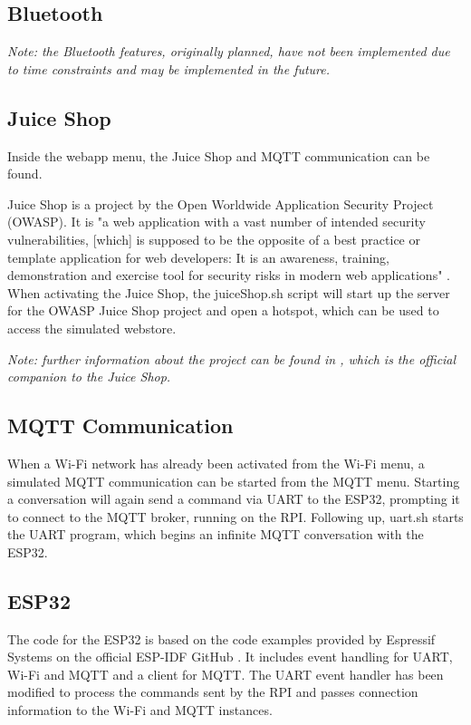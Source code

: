 

\subsection{Bluetooth}
\textit{Note: the Bluetooth features, originally planned, have not been implemented due to time constraints and may be implemented in the future.}

\subsection{Juice Shop}\label{ssec:juice_shop}
Inside the webapp menu, the Juice Shop and MQTT communication can be found.

Juice Shop is a project by the Open Worldwide Application Security Project (OWASP).
It is "a web application with a vast number of intended security vulnerabilities, [which] is supposed to be the opposite of a best practice or template application for web developers: It is an awareness, training, demonstration and exercise tool for security risks in modern web applications" \cite{PWNING_JuiceShop}.
When activating the Juice Shop, the juiceShop.sh script will start up the server for the OWASP Juice Shop project and open a hotspot, which can be used to access the simulated webstore.

\textit{Note: further information about the project can be found in \cite{PWNING_JuiceShop}, which is the official companion to the Juice Shop.}

\subsection{MQTT Communication}
When a Wi-Fi network has already been activated from the Wi-Fi menu, a simulated MQTT communication can be started from the MQTT menu.
Starting a conversation will again send a command via UART to the ESP32, prompting it to connect to the MQTT broker, running on the RPI.
Following up, uart.sh starts the UART program, which begins an infinite MQTT conversation with the ESP32.

\subsection{ESP32}
The code for the ESP32 is based on the code examples provided by Espressif Systems on the official ESP-IDF GitHub \cite{espidf}.
It includes event handling for UART, Wi-Fi and MQTT and a client for MQTT.
The UART event handler has been modified to process the commands sent by the RPI and passes connection information to the Wi-Fi and MQTT instances.


